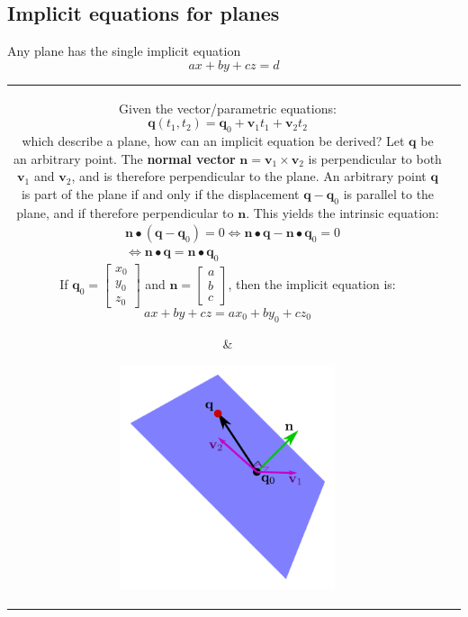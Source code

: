 \documentclass{article}
\begin{document}
\subsection*{Implicit equations for planes}

Any plane has the single implicit equation 
\[ax + by + cz = d\]

\begin{tabular}{cc}
\parbox{0.5\textwidth}{
Given the vector/parametric equations:
\[\mathbf{q}(t_1, t_2) = \mathbf{q}_0 + \mathbf{v}_1 t_1 + \mathbf{v}_2 t_2 \]
which describe a plane, how can an implicit equation be derived? Let \(\mathbf{q}\) be an arbitrary point. The {\bf normal vector} \(\mathbf{n} = \mathbf{v}_1 \times \mathbf{v}_2\) is perpendicular to both \(\mathbf{v}_1\) and \(\mathbf{v}_2\), and is therefore perpendicular to the plane. An arbitrary point \(\mathbf{q}\) is part of the plane if and only if the displacement \(\mathbf{q} - \mathbf{q}_0\) is parallel to the plane, and if therefore perpendicular to \(\mathbf{n}\). This yields the intrinsic equation: 
\begin{align*}
& \mathbf{n} \bullet (\mathbf{q} - \mathbf{q}_0) = 0 \iff \mathbf{n} \bullet \mathbf{q} - \mathbf{n} \bullet \mathbf{q}_0 = 0 \\
& \iff \mathbf{n} \bullet \mathbf{q} = \mathbf{n} \bullet \mathbf{q}_0
\end{align*} 
If \(\mathbf{q}_0 = \begin{bmatrix} x_0 \\ y_0 \\ z_0 \end{bmatrix}\) and \(\mathbf{n} = \begin{bmatrix} a \\ b \\ c \end{bmatrix}\), then the implicit equation is:
\[a x + b y + c z  = a x_0 + b y_0 + c z_0\]
} & \parbox{0.5\textwidth}{
\includegraphics[width = 0.5\textwidth]{implicit_equation_of_the_plane}
}
\end{tabular}
\end{document}
